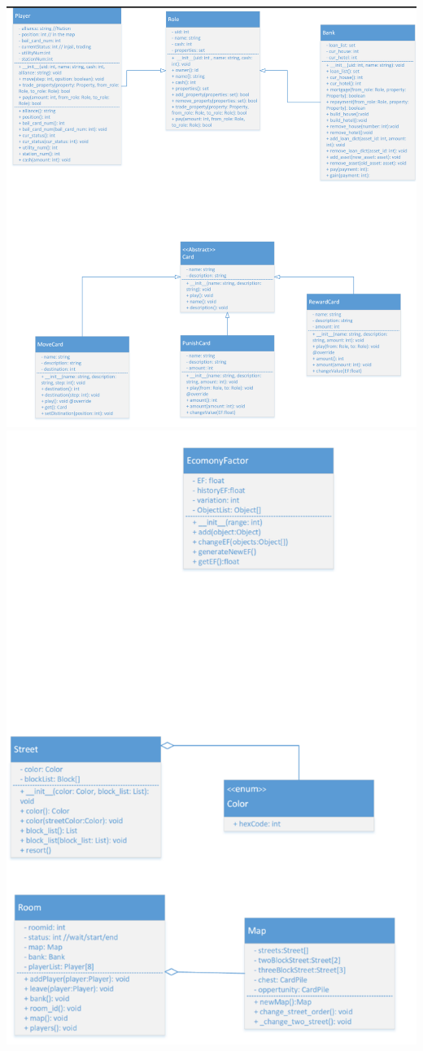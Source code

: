 \documentclass[a4paper,12pt]{article}
\begin{document}
\includegraphics[scale=0.9]{image/roleandcard.png}
\includegraphics[scale=1.3]{image/efandmain.png}
\end{document}
